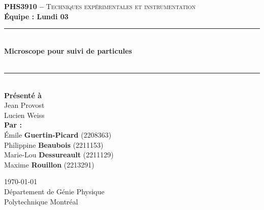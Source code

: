 \documentclass[11pt,letterpaper]{article}
\begin{document}
\begin{titlepage}
\center

\begin{figure}
\end{figure}
\vspace*{2 cm}

\textsc{\Large \textbf{PHS3910 --} Techniques expérimentales et instrumentation}\\[0.5cm]
\large{\textbf{Équipe : Lundi 03}}\\[1.5cm]

\rule{\linewidth}{0.5mm} \\[0.5cm]
\Large{\textbf{Microscope pour suivi de particules}} \\[0.2cm]
\\
\rule{\linewidth}{0.5mm} \\[2.3cm]

\large{\textbf{Présenté à}\\
  Jean Provost\\
  Lucien Weiss\\[2.5cm]
  \textbf{Par :}\\
  Émile \textbf{Guertin-Picard} (2208363)\\
  Philippine \textbf{Beaubois} (2211153)\\
  Marie-Lou \textbf{Dessureault} (2211129)\\
  Maxime \textbf{Rouillon} (2213291)\\[3cm]}

\large{\today\\
Département de Génie Physique\\
Polytechnique Montréal\\}

\end{titlepage}


\tableofcontents
{}
\newpage

\pagestyle{fancy}
\setlength{\headheight}{14pt}
\renewcommand{\headrulewidth}{0pt}
\fancyfoot[R]{\thepage}

\pagestyle{fancy}
\fancyhf{}
\renewcommand{\headrulewidth}{1pt}
\fancyhead[R]{\today}
\fancyfoot[R]{\thepage}

\setcounter{page}{1}
\end{document}
